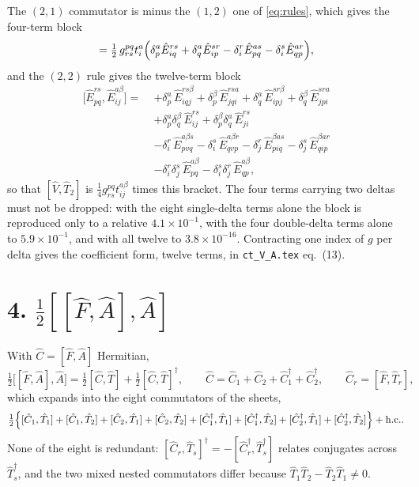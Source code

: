 \documentclass[11pt]{article}
\newcommand{\E}[2]{\hat E^{#1}_{#2}}
\newcommand{\hc}{\mathrm{h.c.}}
\newcommand{\occ}{i}
\newcommand{\vir}{a}
\begin{document}
The $(2,1)$ commutator is minus the $(1,2)$ one of \eqref{eq:rules}, which gives
the four-term block
\begin{equation}
  [\hat V,\hat T_1]=\tfrac12\,g^{pq}_{rs}t^\vir_\occ
   \Bigl(\delta^\vir_p\E{rs}{\occ q}+\delta^\vir_q\E{sr}{\occ p}
    -\delta^r_\occ\E{\vir s}{pq}-\delta^s_\occ\E{\vir r}{qp}\Bigr),
  \label{eq:VT1}
\end{equation}
and the $(2,2)$ rule gives the twelve-term block
\begin{equation}
  \begin{aligned}
  \bigl[\E{rs}{pq},\E{\vir\beta}{\occ j}\bigr]=\;
   &+\delta^\vir_p\,\E{rs\beta}{\occ qj}
    +\delta^\beta_p\,\E{rs\vir}{jq\occ}
    +\delta^\vir_q\,\E{sr\beta}{\occ pj}
    +\delta^\beta_q\,\E{sr\vir}{jp\occ}\\
   &+\delta^\vir_p\delta^\beta_q\,\E{rs}{\occ j}
    +\delta^\beta_p\delta^\vir_q\,\E{rs}{j\occ}\\
   &-\delta^r_\occ\,\E{\vir\beta s}{pvq}
    -\delta^s_\occ\,\E{\vir\beta r}{qvp}
    -\delta^r_j\,\E{\beta\vir s}{p\occ q}
    -\delta^s_j\,\E{\beta\vir r}{q\occ p}\\
   &-\delta^r_\occ\delta^s_j\,\E{\vir\beta}{pq}
    -\delta^s_\occ\delta^r_j\,\E{\vir\beta}{qp},
  \end{aligned}
  \label{eq:VT2}
\end{equation}
so that $[\hat V,\hat T_2]$ is $\tfrac14g^{pq}_{rs}t^{\vir\beta}_{\occ j}$ times
this bracket. The four terms carrying two deltas must not be dropped: with the
eight single-delta terms alone the block is reproduced only to a relative
$4.1\times10^{-1}$, with the four double-delta terms alone to $5.9\times10^{-1}$,
and with all twelve to $3.8\times10^{-16}$. Contracting one index of $g$ per
delta gives the coefficient form, twelve terms, in \texttt{ct\_V\_A.tex}
eq.~(13).

\section*{4. \texorpdfstring{$\tfrac12[[\hat F,\hat A],\hat A]$}{1/2[[F,A],A]}}

With $\hat C=[\hat F,\hat A]$ Hermitian,
\begin{equation}
  \tfrac12\bigl[[\hat F,\hat A],\hat A\bigr]
   =\tfrac12[\hat C,\hat T]+\tfrac12[\hat C,\hat T]^\dagger,
  \qquad
  \hat C=\hat C_1+\hat C_2+\hat C_1^\dagger+\hat C_2^\dagger,
  \qquad
  \hat C_r=[\hat F,\hat T_r],
  \label{eq:dbl}
\end{equation}
which expands into the eight commutators of the sheets,
\begin{equation}
  \tfrac12\Bigl\{
    [\hat C_1,\hat T_1]+[\hat C_1,\hat T_2]+[\hat C_2,\hat T_1]+[\hat C_2,\hat T_2]
   +[\hat C_1^\dagger,\hat T_1]+[\hat C_1^\dagger,\hat T_2]
   +[\hat C_2^\dagger,\hat T_1]+[\hat C_2^\dagger,\hat T_2]\Bigr\}+\hc .
  \label{eq:eight}
\end{equation}
None of the eight is redundant: $[\hat C_r,\hat T_s]^\dagger
=-[\hat C_r^\dagger,\hat T_s^\dagger]$ relates conjugates across
$\hat T_s^\dagger$, and the two mixed nested commutators differ because
$\hat T_1\hat T_2-\hat T_2\hat T_1\neq0$.
\end{document}
